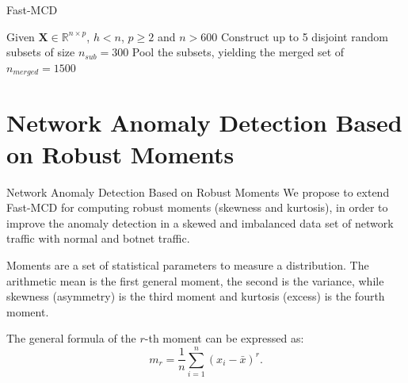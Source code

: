 \documentclass[newPxFont, numfooter, sectionpages]{beamer}
\begin{document}
\begin{frame}[c]{Fast-MCD}
	\begin{algorithm}[H]\label{alg:alg04}
		\scriptsize
		\SetAlgoLined
		Given $\boldsymbol{X} \in \mathbb{R}^{n \times p}$, $h < n$, $p \geq 2$ and $n > 600$\;
		Construct up to 5 disjoint random subsets of size $n_{sub} = 300$\;
		Pool the subsets, yielding the merged set of $n_{merged} = 1500$\;
		\caption{Fast-MCD when $n > 600$}
	\end{algorithm}
\end{frame}


\section{Network Anomaly Detection Based on Robust Moments}

\begin{frame}{Network Anomaly Detection Based on Robust Moments}
	We propose to extend Fast-MCD for computing robust moments (skewness and kurtosis), in order to improve the anomaly detection in a skewed and imbalanced data set of network traffic with normal and botnet traffic.
		    
	Moments are a set of statistical parameters to measure a distribution. The arithmetic mean is the first general moment, the second is the variance, while skewness (asymmetry) is the third moment and kurtosis (excess) is the fourth moment.
	
	The general formula of the $r$-th moment can be expressed as:
	\begin{equation}\label{eq:eq05}
		m_r = \displaystyle\frac{1}{n}\displaystyle\sum_{i = 1}^{n}( x_i - \bar{x})^r. 
	\end{equation}
\end{frame}
\end{document}
